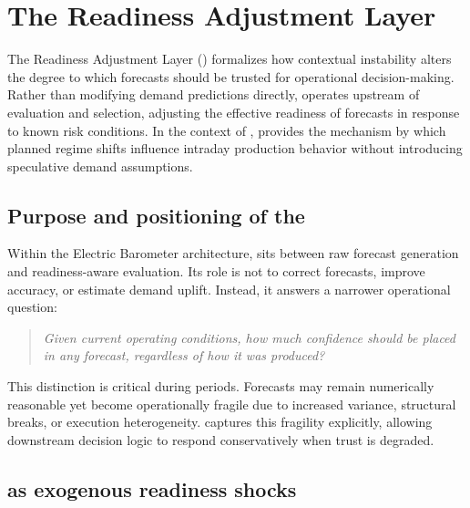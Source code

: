 
\section{The Readiness Adjustment Layer}
\label{sec:ral}

The Readiness Adjustment Layer (\RAL{}) formalizes how contextual instability alters the degree to
which forecasts should be trusted for operational decision-making. Rather than modifying demand
predictions directly, \RAL{} operates upstream of evaluation and selection, adjusting the effective
readiness of forecasts in response to known risk conditions. In the context of \LTOs{}, \RAL{}
provides the mechanism by which planned regime shifts influence intraday production behavior
without introducing speculative demand assumptions.



\subsection{Purpose and positioning of the \RAL{}}
\label{subsec:ral-purpose}

Within the Electric Barometer architecture, \RAL{} sits between raw forecast generation and
readiness-aware evaluation. Its role is not to correct forecasts, improve accuracy, or estimate
demand uplift. Instead, it answers a narrower operational question:

\begin{quote}
\emph{Given current operating conditions, how much confidence should be placed in any forecast,
regardless of how it was produced?}
\end{quote}

This distinction is critical during \LTO{} periods. Forecasts may remain numerically reasonable yet
become operationally fragile due to increased variance, structural breaks, or execution
heterogeneity. \RAL{} captures this fragility explicitly, allowing downstream decision logic to
respond conservatively when trust is degraded.

\subsection{\LTOs{} as exogenous readiness shocks}
\label{subsec:lto-readiness-shocks}

